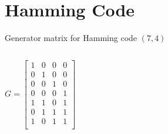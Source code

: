 \section{Hamming Code}

\begin{frame}{Generator matrix for Hamming code $(7,4)$}
  \begin{columns}
	  \[
		G = \begin{bmatrix}
		  1 & 0 & 0 & 0 \\
		  0 & 1 & 0 & 0 \\
		  0 & 0 & 1 & 0 \\
		  0 & 0 & 0 & 1 \\
		  1 & 1 & 0 & 1 \\
		  0 & 1 & 1 & 1 \\
		  1 & 0 & 1 & 1 \\
		\end{bmatrix}
	  \]
  \end{columns}
\end{frame}

